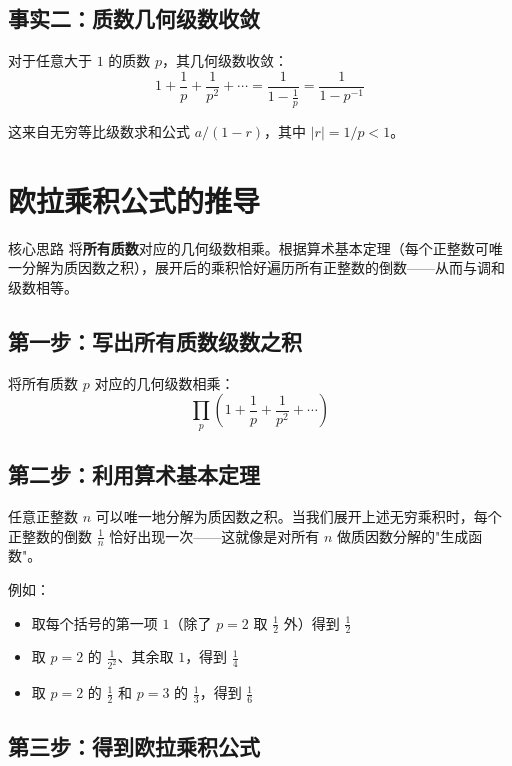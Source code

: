 \documentclass[11pt,a4paper]{ctexart}
\newcommand{\highlight}[1]{\colorbox{accent!20}{\sffamily\bfseries #1}}
\begin{document}
\subsection*{事实二：质数几何级数收敛}

对于任意大于 $1$ 的质数 $p$，其几何级数收敛：
\[
  1 + \frac{1}{p} + \frac{1}{p^2} + \cdots = \frac{1}{1 - \frac{1}{p}} = \frac{1}{1 - p^{-1}}
\]

这来自无穷等比级数求和公式 $a/(1-r)$，其中 $|r| = 1/p < 1$。

\newpage

\section{欧拉乘积公式的推导}

\begin{methodbox}{核心思路}
将\highlight{所有质数}对应的几何级数相乘。根据算术基本定理（每个正整数可唯一分解为质因数之积），展开后的乘积恰好遍历所有正整数的倒数——从而与调和级数相等。
\end{methodbox}

\subsection*{第一步：写出所有质数级数之积}

将所有质数 $p$ 对应的几何级数相乘：
\[
  \prod_{p} \left( 1 + \frac{1}{p} + \frac{1}{p^2} + \cdots \right)
\]

\subsection*{第二步：利用算术基本定理}

任意正整数 $n$ 可以唯一地分解为质因数之积。当我们展开上述无穷乘积时，每个正整数的倒数 $\frac{1}{n}$ 恰好出现一次——这就像是对所有 $n$ 做质因数分解的"生成函数"。

例如：
\begin{itemize}
  \item 取每个括号的第一项 $1$（除了 $p=2$ 取 $\frac{1}{2}$ 外）得到 $\frac{1}{2}$
  \item 取 $p=2$ 的 $\frac{1}{2^2}$、其余取 $1$，得到 $\frac{1}{4}$
  \item 取 $p=2$ 的 $\frac{1}{2}$ 和 $p=3$ 的 $\frac{1}{3}$，得到 $\frac{1}{6}$
\end{itemize}

\subsection*{第三步：得到欧拉乘积公式}
\end{document}
